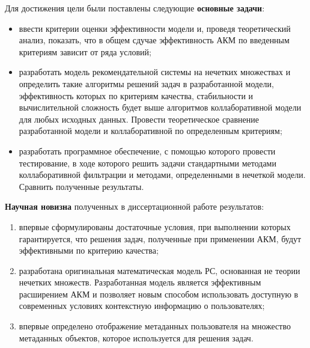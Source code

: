 Для достижения цели были поставлены следующие
{\bf основные задачи}:
\begin{itemize}
	\item ввести критерии оценки эффективности модели и, проведя теоретический
		анализ, показать, что
		в общем сдучае эффективность АКМ по введенным критериям
		зависит от ряда условий;
	\item разработать модель рекомендательной системы на нечетких
		множествах и определить такие алгоритмы решений задач в разработанной
		модели, эффективность которых по критериям качества, стабильности и
		вычислительной
		сложность будет выше алгоритмов коллаборативной модели для любых
		исходных данных.
		Провести теоретическое сравнение разработанной модели и
		коллаборативной по определенным критериям;
	\item разработать программное обеспечение, с помощью которого
		провести тестирование, в ходе которого решить задачи стандартными
		методами коллаборативной фильтрации и методами, определенными в
		нечеткой модели. Сравнить полученные результаты.
\end{itemize}

{\bf Научная новизна} полученных в диссертационной работе результатов:
\begin{enumerate}
\item впервые сформулированы достаточные условия, при выполнении которых гарантируется,
	что решения задач, полученные при применении АКМ,
	будут эффективными по критерию качества;
\item разработана оригинальная математическая модель РС, основанная не теории
	нечетких множеств. Разработанная модель
	является эффективным расширением АКМ и
	позволяет новым способом использовать доступную в современных
	условиях контекстную информацию о пользователях;
\item впервые определено отображение метаданных пользователя
	на множество метаданных объектов, которое используется для решения задач.
\end{enumerate}


